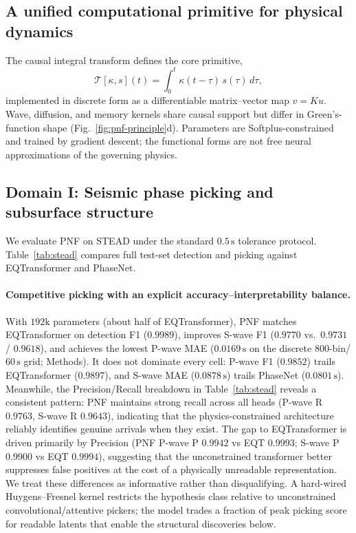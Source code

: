 \documentclass[twocolumn, 10pt]{article}
\newcommand{\pnf}{\textsc{PNF}}
\begin{document}
\subsection*{A unified computational primitive for physical dynamics}

The causal integral transform defines the core primitive,
\[
\mathcal{T}[\kappa, s](t)=\int_{0}^{t}\kappa(t-\tau)\,s(\tau)\,d\tau,
\]
implemented in discrete form as a differentiable matrix--vector map \(v=Ku\). Wave, diffusion, and memory kernels share causal support but differ in Green's-function shape (Fig.~\ref{fig:pnf-principle}d). Parameters are Softplus-constrained and trained by gradient descent; the functional forms are not free neural approximations of the governing physics.

\subsection*{Domain I: Seismic phase picking and subsurface structure}

We evaluate \pnf{} on STEAD\cite{stead2019} under the standard \(0.5\,\mathrm{s}\) tolerance protocol\cite{mousavi2020eqt}. Table~\ref{tab:stead} compares full test-set detection and picking against EQTransformer\cite{mousavi2020eqt} and PhaseNet\cite{zhu2018phasenet}.

\paragraph{Competitive picking with an explicit accuracy--interpretability balance.}
With \(192\mathrm{k}\) parameters (about half of EQTransformer), \pnf{} matches EQTransformer on detection F1 (\(0.9989\)), improves S-wave F1 (\(0.9770\) vs.\ \(0.9731\) / \(0.9618\)), and achieves the lowest P-wave MAE (\(0.0169\,\mathrm{s}\) on the discrete \(800\)-bin/\(60\,\mathrm{s}\) grid; Methods). It does not dominate every cell: P-wave F1 (\(0.9852\)) trails EQTransformer (\(0.9897\)), and S-wave MAE (\(0.0878\,\mathrm{s}\)) trails PhaseNet (\(0.0801\,\mathrm{s}\)). Meanwhile, the Precision/Recall breakdown in Table~\ref{tab:stead} reveals a consistent pattern: PNF maintains strong recall across all heads (P-wave R \(0.9763\), S-wave R \(0.9643\)), indicating that the physics-constrained architecture reliably identifies genuine arrivals when they exist. The gap to EQTransformer is driven primarily by Precision (PNF P-wave P \(0.9942\) vs EQT \(0.9993\); S-wave P \(0.9900\) vs EQT \(0.9994\)), suggesting that the unconstrained transformer better suppresses false positives at the cost of a physically unreadable representation. We treat these differences as informative rather than disqualifying. A hard-wired Huygens--Fresnel kernel restricts the hypothesis class relative to unconstrained convolutional/attentive pickers; the model trades a fraction of peak picking score for readable latents that enable the structural discoveries below.
\end{document}
